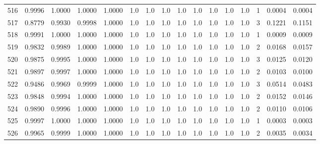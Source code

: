 \begin{tabular}{lrrrrrrrrrrrrrrr}
516 &      0.9996 &  1.0000 &  1.0000 &  1.0000 &     1.0 &     1.0 &     1.0 &     1.0 &     1.0 &     1.0 &      1.0 &        1.0 &      1 &                    0.0004 &                     0.0004 \\
517 &      0.8779 &  0.9930 &  0.9998 &  1.0000 &     1.0 &     1.0 &     1.0 &     1.0 &     1.0 &     1.0 &      1.0 &        1.0 &      3 &                    0.1221 &                     0.1151 \\
518 &      0.9991 &  1.0000 &  1.0000 &  1.0000 &     1.0 &     1.0 &     1.0 &     1.0 &     1.0 &     1.0 &      1.0 &        1.0 &      1 &                    0.0009 &                     0.0009 \\
519 &      0.9832 &  0.9989 &  1.0000 &  1.0000 &     1.0 &     1.0 &     1.0 &     1.0 &     1.0 &     1.0 &      1.0 &        1.0 &      2 &                    0.0168 &                     0.0157 \\
520 &      0.9875 &  0.9995 &  1.0000 &  1.0000 &     1.0 &     1.0 &     1.0 &     1.0 &     1.0 &     1.0 &      1.0 &        1.0 &      3 &                    0.0125 &                     0.0120 \\
521 &      0.9897 &  0.9997 &  1.0000 &  1.0000 &     1.0 &     1.0 &     1.0 &     1.0 &     1.0 &     1.0 &      1.0 &        1.0 &      2 &                    0.0103 &                     0.0100 \\
522 &      0.9486 &  0.9969 &  0.9999 &  1.0000 &     1.0 &     1.0 &     1.0 &     1.0 &     1.0 &     1.0 &      1.0 &        1.0 &      3 &                    0.0514 &                     0.0483 \\
523 &      0.9848 &  0.9994 &  1.0000 &  1.0000 &     1.0 &     1.0 &     1.0 &     1.0 &     1.0 &     1.0 &      1.0 &        1.0 &      2 &                    0.0152 &                     0.0146 \\
524 &      0.9890 &  0.9996 &  1.0000 &  1.0000 &     1.0 &     1.0 &     1.0 &     1.0 &     1.0 &     1.0 &      1.0 &        1.0 &      2 &                    0.0110 &                     0.0106 \\
525 &      0.9997 &  1.0000 &  1.0000 &  1.0000 &     1.0 &     1.0 &     1.0 &     1.0 &     1.0 &     1.0 &      1.0 &        1.0 &      1 &                    0.0003 &                     0.0003 \\
526 &      0.9965 &  0.9999 &  1.0000 &  1.0000 &     1.0 &     1.0 &     1.0 &     1.0 &     1.0 &     1.0 &      1.0 &        1.0 &      2 &                    0.0035 &                     0.0034 \\

\end{tabular}
